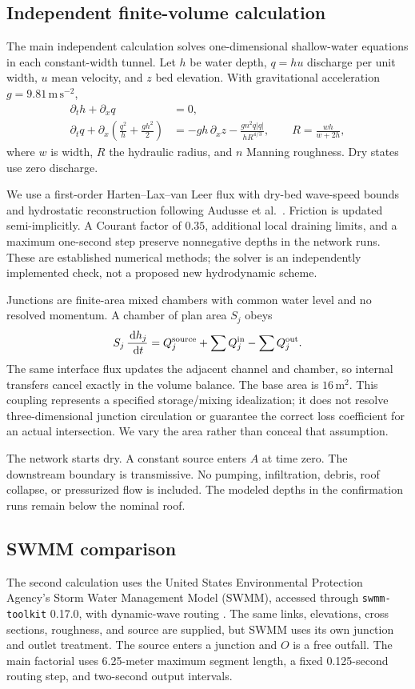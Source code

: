\documentclass[11pt]{article}
\newcommand{\dd}{\,\mathrm d}
\begin{document}
\subsection{Independent finite-volume calculation}
The main independent calculation solves one-dimensional shallow-water equations in each constant-width tunnel. Let \(h\) be water depth, \(q=hu\) discharge per unit width, \(u\) mean velocity, and \(z\) bed elevation. With gravitational acceleration \(g=9.81\,\mathrm{m\,s^{-2}}\),
\begin{align}
 \partial_t h+\partial_x q&=0,\\
 \partial_t q+\partial_x\!\left(\frac{q^2}{h}+\frac{gh^2}{2}\right)
 &=-gh\,\partial_x z-\frac{g n^2 q|q|}{h R^{4/3}},
 \qquad R=\frac{wh}{w+2h},                               \label{eq:swe}
\end{align}
where \(w\) is width, \(R\) the hydraulic radius, and \(n\) Manning roughness. Dry states use zero discharge.

We use a first-order Harten--Lax--van Leer flux with dry-bed wave-speed bounds and hydrostatic reconstruction following Audusse et al.~\cite{audusse}. Friction is updated semi-implicitly. A Courant factor of \(0.35\), additional local draining limits, and a maximum one-second step preserve nonnegative depths in the network runs. These are established numerical methods; the solver is an independently implemented check, not a proposed new hydrodynamic scheme.

Junctions are finite-area mixed chambers with common water level and no resolved momentum. A chamber of plan area \(S_j\) obeys
\[
 S_j\,\frac{\dd h_j}{\dd t}=Q_j^{\rm source}
       +\sum Q_j^{\rm in}-\sum Q_j^{\rm out}.
\]
The same interface flux updates the adjacent channel and chamber, so internal transfers cancel exactly in the volume balance. The base area is \(16\,\mathrm{m^2}\). This coupling represents a specified storage/mixing idealization; it does not resolve three-dimensional junction circulation or guarantee the correct loss coefficient for an actual intersection. We vary the area rather than conceal that assumption.

The network starts dry. A constant source enters \(A\) at time zero. The downstream boundary is transmissive. No pumping, infiltration, debris, roof collapse, or pressurized flow is included. The modeled depths in the confirmation runs remain below the nominal roof.

\subsection{SWMM comparison}
The second calculation uses the United States Environmental Protection Agency's Storm Water Management Model (SWMM), accessed through \texttt{swmm-toolkit} 0.17.0, with dynamic-wave routing \cite{swmm}. The same links, elevations, cross sections, roughness, and source are supplied, but SWMM uses its own junction and outlet treatment. The source enters a junction and \(O\) is a free outfall. The main factorial uses 6.25-meter maximum segment length, a fixed 0.125-second routing step, and two-second output intervals.
\end{document}
